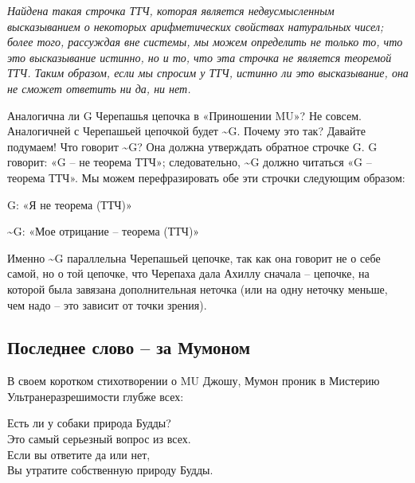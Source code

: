 \documentclass[../main.tex]{subfiles}
\begin{document}
\emph{Найдена такая строчка ТТЧ, которая является недвусмысленным высказыванием о некоторых арифметических свойствах натуральных чисел; более того, рассуждая вне системы, мы можем определить не только то, что это высказывание истинно, но и то, что эта строчка не является теоремой ТТЧ. Таким образом, если мы спросим у ТТЧ, истинно ли это высказывание, она не сможет ответить ни да, ни нет.}

Аналогична ли G Черепашья цепочка в «Приношении MU»? Не совсем. Аналогичней с Черепашьей цепочкой будет \textasciitilde G. Почему это так? Давайте подумаем! Что говорит \textasciitilde G? Она должна утверждать обратное строчке G. G говорит: «G \--- не теорема ТТЧ»; следовательно, \textasciitilde G должно читаться «G \--- теорема ТТЧ». Мы можем перефразировать обе эти строчки следующим образом:

G: «Я не теорема (ТТЧ)»

\textasciitilde G: «Мое отрицание \--- теорема (ТТЧ)»

Именно \textasciitilde G параллельна Черепашьей цепочке, так как она говорит не о себе самой, но о той цепочке, что Черепаха дала Ахиллу сначала \--- цепочке, на которой была завязана дополнительная неточка (или на одну неточку меньше, чем надо \--- это зависит от точки зрения).


\subsection{Последнее слово \--- за Мумоном}

В своем коротком стихотворении о MU Джошу, Мумон проник в Мистерию Ультранеразрешимости глубже всех:

\settowidth{\dimen42}{Вы утратите собственную природу Будды.}
\begin{koan}[center, text width=\dimen42, fontupper=\normalsize]
    Есть ли у собаки природа Будды? \\
    Это самый серьезный вопрос из всех. \\
    Если вы ответите да или нет, \\
    Вы утратите собственную природу Будды.
\end{koan}

\endgroup
\end{document}
